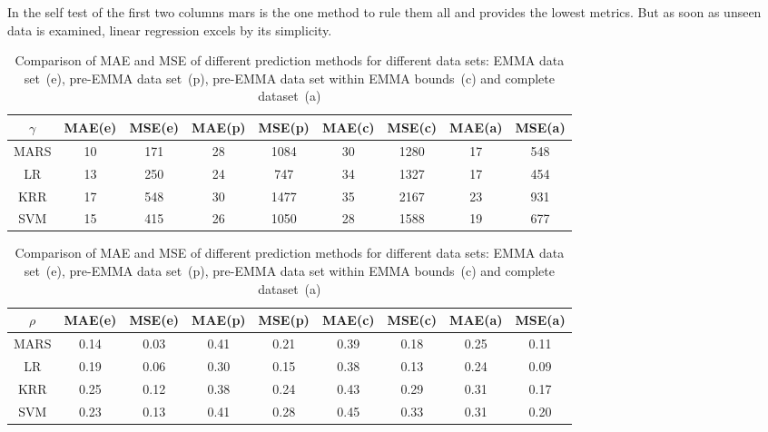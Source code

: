 In the self test of the first two columns \gls{mars} is the one method to rule them all and provides the lowest metrics.
But as soon as unseen data is examined, linear regression excels by its simplicity. 
%
%
\begin{table}[htb]
	\centering
	\begin{tabular}{c cc cc cc cc}
    \hline\hline
        $\gamma$&  MAE(e)&   MSE(e)&   MAE(p)&   MSE(p)&   MAE(c)&   MSE(c)&   MAE(a)& MSE(a) \\
    \hline
        MARS&   10& 171&    28& 1084&   30& 1280&   17& 548\\
        LR&    13& 250&    24& 747&    34& 1327&   17& 454\\
        KRR &17 &548 &30 &1477 &35 &2167 &23 &931\\
        SVM& 15&  415&    26& 1050&   28& 1588&   19& 677\\
        \hline
	\end{tabular}
	\begin{tabular}{c cc cc cc cc}
    \hline\hline
        $\rho$&  MAE(e)&   MSE(e)&   MAE(p)&   MSE(p)&   MAE(c)&   MSE(c)&   MAE(a)& MSE(a) \\
    \hline
        MARS&   0.14&   0.03&   0.41&   0.21&   0.39&   0.18&   0.25&   0.11\\
        LR&    0.19&   0.06&   0.30&   0.15&   0.38&   0.13&   0.24&   0.09\\
        KRR &0.25 &0.12 &0.38 &0.24 &0.43 &0.29 &0.31 &0.17\\
        SVM &0.23 &0.13 &0.41 &0.28 &0.45 &0.33 &0.31 &0.20\\
    \hline\hline
	\end{tabular}
    \caption{Comparison of MAE and MSE of different prediction methods for different data sets: EMMA data set~(e), pre-EMMA data set~(p), pre-EMMA data set within EMMA bounds~(c) and complete dataset~(a)}
	\label{tab:post-emma}
\end{table}
    
